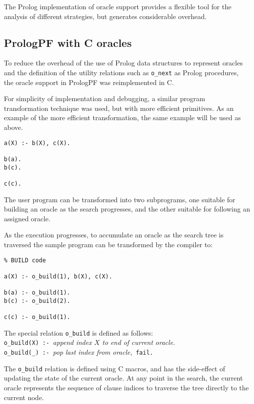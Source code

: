 The Prolog implementation of oracle support provides a flexible tool for
the analysis of different strategies, but generates considerable overhead.

\subsection{PrologPF with C oracles}
\label{c_macros}

To reduce the overhead of the use of Prolog data structures to represent
oracles and the definition of the utility relations such as \texttt{o\_{}next} as
Prolog procedures, the oracle support in PrologPF was reimplemented in C.

For simplicity of implementation and debugging, a similar program
transformation technique was used, but with more efficient primitives.
As an example of the more efficient transformation, the same example will
be used as above.
\begin{verbatim}
a(X) :- b(X), c(X).

b(a).
b(c).

c(c).
\end{verbatim}
The user program can be transformed into two subprograms, one suitable for
building an oracle as the search progresses, and the other suitable for
following an assigned oracle.

As the execution progresses, to accumulate an oracle as the search tree is traversed the
sample program can be transformed by the compiler to:
\begin{verbatim}
% BUILD code

a(X) :- o_build(1), b(X), c(X).

b(a) :- o_build(1).
b(c) :- o_build(2).

c(c) :- o_build(1).
\end{verbatim}

The special relation \texttt{o\_{}build} is defined as follows:\\

\texttt{o\_{}build(X) :- }\textit{append index $X$ to end of current oracle.}\\
\texttt{o\_{}build(\_{}) :- }\textit{pop last index from oracle,}\texttt{ fail.}

The \texttt{o\_{}build} relation is defined using C macros, and has the side-effect of
updating the state of the current oracle.  At any point in the search, the current oracle
represents the sequence of clause indices to traverse the tree directly to the current
node.

